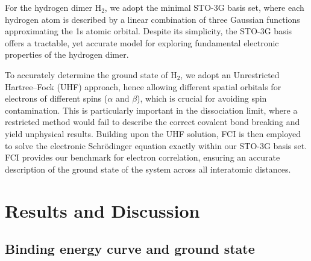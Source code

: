 \documentclass[aps,prl,twocolumn,groupedaddress, reprint,floatfix,nofootinbib,longbibliography]{revtex4-2}
\begin{document}
    For the hydrogen dimer H$_2$, we adopt the minimal STO-3G basis set, where each hydrogen atom is described by a linear combination of three Gaussian functions approximating the 1s atomic orbital. Despite its simplicity, the STO-3G basis offers a tractable, yet accurate model for exploring fundamental electronic properties of the hydrogen dimer.

    To accurately determine the ground state of H$_2$, we adopt an Unrestricted Hartree--Fock (UHF) approach, hence allowing different spatial orbitals for electrons of different spins ($\alpha$ and $\beta$), which is crucial for avoiding spin contamination. This is particularly important in the dissociation limit, where a restricted method would fail to describe the correct covalent bond breaking and yield unphysical results. Building upon the UHF solution, FCI is then employed to solve the electronic Schrödinger equation exactly within our STO-3G basis set. FCI provides our benchmark for electron correlation, ensuring an accurate description of the ground state of the system across all interatomic distances.

\section{Results and Discussion}

    \subsection{Binding energy curve and ground state}
\end{document}
